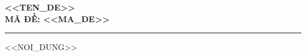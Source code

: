 \documentclass[12pt,a4paper]{article}
\begin{document}
\begin{center}
  {\Large\bfseries <<TEN_DE>>}\\[4pt]
  \textbf{MÃ ĐỀ: <<MA_DE>>}
\end{center}
\hrule
\vspace{8pt}

<<NOI_DUNG>>
\end{document}
